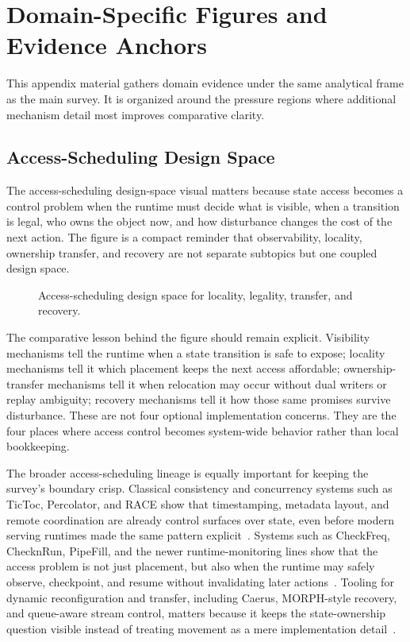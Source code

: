 \section{Domain-Specific Figures and Evidence Anchors}

This appendix material gathers domain evidence under the same analytical frame as the main survey. It is organized around the pressure regions where additional mechanism detail most improves comparative clarity.

\subsection{Access-Scheduling Design Space}

The access-scheduling design-space visual matters because state access becomes a control problem when the runtime must decide what is visible, when a transition is legal, who owns the object now, and how disturbance changes the cost of the next action. The figure is a compact reminder that observability, locality, ownership transfer, and recovery are not separate subtopics but one coupled design space.

\begin{figure}[t]
\centering
\resizebox{0.94\textwidth}{!}{}
\caption{Access-scheduling design space for locality, legality, transfer, and recovery.}
\label{fig:supp-access-designspace}
\end{figure}

The comparative lesson behind the figure should remain explicit. Visibility mechanisms tell the runtime when a state transition is safe to expose; locality mechanisms tell it which placement keeps the next access affordable; ownership-transfer mechanisms tell it when relocation may occur without dual writers or replay ambiguity; recovery mechanisms tell it how those same promises survive disturbance. These are not four optional implementation concerns. They are the four places where access control becomes system-wide behavior rather than local bookkeeping.

The broader access-scheduling lineage is equally important for keeping the survey's boundary crisp. Classical consistency and concurrency systems such as TicToc, Percolator, and RACE show that timestamping, metadata layout, and remote coordination are already control surfaces over state, even before modern serving runtimes made the same pattern explicit~\cite{yu2016tictoc,peng2010percolator,zuo2021race}. Systems such as CheckFreq, ChecknRun, PipeFill, and the newer runtime-monitoring lines show that the access problem is not just placement, but also when the runtime may safely observe, checkpoint, and resume without invalidating later actions~\cite{mohan2021checkfreq,eisenman2022checknrun,arfeen2024pipefill,zhou2024neomem}. Tooling for dynamic reconfiguration and transfer, including Caerus, MORPH-style recovery, and queue-aware stream control, matters because it keeps the state-ownership question visible instead of treating movement as a mere implementation detail~\cite{zhang2021caerus,mao2023morphstream,fu2024autocheck,gao2025deck}.

